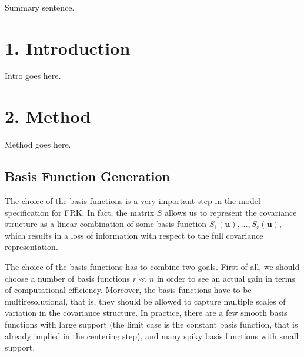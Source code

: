 \documentclass[11pt]{article}
\title{
\vspace{2in}
\textmd{\textbf{\hmwkTitle}}\\
\normalsize\vspace{0.1in}\small{\hmwkDueDate}\\
\vspace{0.1in}\large{\textit{\hmwkClassInstructor\ }}
\vspace{3in}
}
\author{\textbf{\hmwkAuthorName}}
\date{} %
\begin{document}
\maketitle



\newpage

Summary sentence. 

\section{1. Introduction}

Intro goes here.

\newpage
\section{2. Method}

Method goes here. \\

\subsection{Basis Function Generation}

The choice of the basis functions is a very important step in the model specification for FRK. In fact, the matrix $S$ allows us to represent the covariance structure as a linear combination of some basis function $S_1(\bm{u}), \dots, S_r(\bm{u})$, which results in a loss of information with respect to the full covariance representation.

The choice of the basis functions has to combine two goals. First of all, we should choose a number of basis functions $r \ll n$ in order to see an actual gain in terms of computational efficiency. Moreover, the basis functions have to be multiresolutional, that is, they should be allowed to capture multiple scales of variation in the covariance structure. In practice, there are a few smooth basis functions with large support (the limit case is the constant basis function, that is already implied in the centering step), and many spiky basis functions with small support. 
\end{document}

